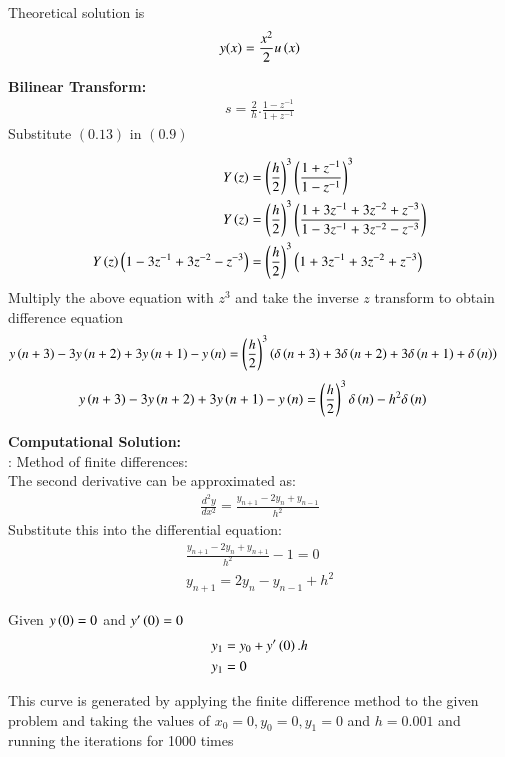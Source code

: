 \documentclass[journal]{IEEEtran}
\begin{document}
Theoretical solution is 
\begin{align}
    y(x) = \frac{x^2}{2} u\left(x\right)
\end{align}

\textbf{Bilinear Transform:}
\begin{align}
    s=\frac{2}{h}.\frac{1-z^{-1}}{1+z^{-1}}
\end{align}
Substitute $(0.13)$ in $(0.9)$

\begin{align}
    Y\left(z\right)&=\left(\frac{h}{2}\right)^3 \left(\frac{1+z^{-1}}{1-z^{-1}}\right)^3\\
    Y\left(z\right)&=\left(\frac{h}{2}\right)^3 \left(\frac{1+3z^{-1}+3z^{-2}+z^{-3}}{1-3z^{-1}+3z^{-2}-z^{-3}}\right)\\
    Y\left(z\right)\left(1-3z^{-1}+3z^{-2}-z^{-3}\right)&=\left(\frac{h}{2}\right)^3 \left(1+3z^{-1}+3z^{-2}+z^{-3}\right)
\end{align}
Multiply the above equation with $z^3$ and take the inverse $z$ transform to obtain difference equation
\begin{align}
    y\left(n+3\right)-3y\left(n+2\right)+3y\left(n+1\right)-y\left(n\right)&=\left(\frac{h}{2}\right)^3\left(\delta\left(n+3\right)+3\delta\left(n+2\right)+3\delta\left(n+1\right)+\delta\left(n\right)\right)   
\end{align}
\begin{align}
    y\left(n+3\right)-3y\left(n+2\right)+3y\left(n+1\right)-y\left(n\right)&=\left(\frac{h}{2}\right)^3 \delta\left(n\right)-h^2\delta\left(n\right)
\end{align}

\textbf{Computational Solution:}\\:
Method of finite differences:\\
The second derivative can be approximated as:
\begin{align}
    \frac{d^2y}{dx^2}=\frac{y_{n+1}-2y_n+y_{n-1}}{h^2}
\end{align}
Substitute this into the differential equation:
\begin{align}
    \frac{y_{n+1}-2y_n+y_{n+1}}{h^2}-1=0\\
    y_{n+1}=2y_{n}-y_{n-1}+h^2
\end{align}

Given $y\left(0\right)=0$ and $y^{\prime}\left(0\right)=0$
\begin{align}
    y_{1}&=y_{0}+y^{\prime}\left(0\right).h\\
    y_1&=0
\end{align}

This curve is generated by applying the finite difference method to the given problem and taking the values of $x_0=0,y_0=0,y_1=0$ and $h=0.001$ and running the iterations for 1000 times 
\end{document}
